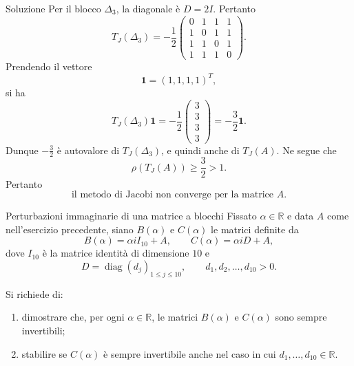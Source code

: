 \documentclass[a4paper]{article}
\begin{document}
\begin{snippetsolution}{Soluzione}
    Per il blocco \(\Delta_3\), la diagonale è \(D=2I\). Pertanto
    \[
        T_J(\Delta_3)
        =
        -\frac{1}{2}
        \begin{pmatrix}
            0 & 1 & 1 & 1\\
            1 & 0 & 1 & 1\\
            1 & 1 & 0 & 1\\
            1 & 1 & 1 & 0
        \end{pmatrix}.
    \]
    Prendendo il vettore
    \[
        \mathbf{1}=(1,1,1,1)^T,
    \]
    si ha
    \[
        T_J(\Delta_3)\mathbf{1}
        =
        -\frac{1}{2}
        \begin{pmatrix}
            3\\
            3\\
            3\\
            3
        \end{pmatrix}
        =
        -\frac{3}{2}\mathbf{1}.
    \]
    Dunque \(-\frac{3}{2}\) è autovalore di \(T_J(\Delta_3)\), e quindi anche di \(T_J(A)\). Ne segue che
    \[
        \rho(T_J(A))\geq \frac{3}{2}>1.
    \]
    Pertanto
    \[
        \text{il metodo di Jacobi non converge per la matrice } A.
    \]
\end{snippetsolution}

\begin{snippetexercise}{Perturbazioni immaginarie di una matrice a blocchi}
    Fissato \(\alpha\in\mathbb{R}\) e data \(A\) come nell'esercizio precedente, siano \(B(\alpha)\) e \(C(\alpha)\) le matrici definite da
    \[
        B(\alpha)=\alpha i I_{10}+A,
        \qquad
        C(\alpha)=\alpha i D+A,
    \]
    dove \(I_{10}\) è la matrice identità di dimensione \(10\) e
    \[
        D=\operatorname{diag}(d_j)_{1\leq j\leq 10},
        \qquad
        d_1,d_2,\dots,d_{10}>0.
    \]

    Si richiede di:
    \begin{enumerate}
        \item dimostrare che, per ogni \(\alpha\in\mathbb{R}\), le matrici \(B(\alpha)\) e \(C(\alpha)\) sono sempre invertibili;
        \item stabilire se \(C(\alpha)\) è sempre invertibile anche nel caso in cui \(d_1,\dots,d_{10}\in\mathbb{R}\).
    \end{enumerate}
\end{snippetexercise}
\end{document}
